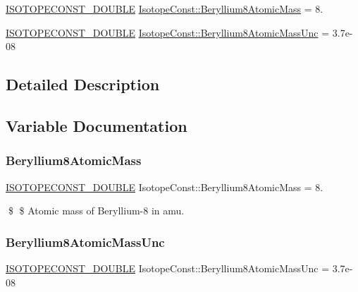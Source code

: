 \begin{DoxyCompactItemize}
\item 
\mbox{\hyperlink{group___isotope_const-_macros_ga8f45a7272ce02c0b4c65c44636ed719a}{I\+S\+O\+T\+O\+P\+E\+C\+O\+N\+S\+T\+\_\+\+D\+O\+U\+B\+LE}} \mbox{\hyperlink{group___isotope_const-_beryllium-_be8_ga7fb930db95dba1b143780e7a0efcb933}{Isotope\+Const\+::\+Beryllium8\+Atomic\+Mass}} = 8.
\item 
\mbox{\hyperlink{group___isotope_const-_macros_ga8f45a7272ce02c0b4c65c44636ed719a}{I\+S\+O\+T\+O\+P\+E\+C\+O\+N\+S\+T\+\_\+\+D\+O\+U\+B\+LE}} \mbox{\hyperlink{group___isotope_const-_beryllium-_be8_gaad7981b0c90b0736ab0d8109f4fcb876}{Isotope\+Const\+::\+Beryllium8\+Atomic\+Mass\+Unc}} = 3.\+7e-\/08
\end{DoxyCompactItemize}


\subsection{Detailed Description}


\subsection{Variable Documentation}
\mbox{\label{group___isotope_const-_beryllium-_be8_ga7fb930db95dba1b143780e7a0efcb933}} 
\subsubsection{\texorpdfstring{Beryllium8\+Atomic\+Mass}{Beryllium8AtomicMass}}
{\footnotesize\ttfamily \mbox{\hyperlink{group___isotope_const-_macros_ga8f45a7272ce02c0b4c65c44636ed719a}{I\+S\+O\+T\+O\+P\+E\+C\+O\+N\+S\+T\+\_\+\+D\+O\+U\+B\+LE}} Isotope\+Const\+::\+Beryllium8\+Atomic\+Mass = 8.}

\$ \$ Atomic mass of Beryllium-\/8 in amu. \mbox{\label{group___isotope_const-_beryllium-_be8_gaad7981b0c90b0736ab0d8109f4fcb876}} 
\subsubsection{\texorpdfstring{Beryllium8\+Atomic\+Mass\+Unc}{Beryllium8AtomicMassUnc}}
{\footnotesize\ttfamily \mbox{\hyperlink{group___isotope_const-_macros_ga8f45a7272ce02c0b4c65c44636ed719a}{I\+S\+O\+T\+O\+P\+E\+C\+O\+N\+S\+T\+\_\+\+D\+O\+U\+B\+LE}} Isotope\+Const\+::\+Beryllium8\+Atomic\+Mass\+Unc = 3.\+7e-\/08}

